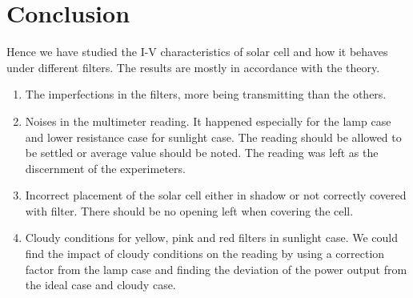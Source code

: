 \section{Conclusion}
Hence we have studied the I-V characteristics of solar cell and how it behaves under different filters. The results are mostly in accordance with the theory.

\begin{enumerate}
	\item The imperfections in the filters, more being transmitting than the others.
	\item Noises in the multimeter reading. It happened especially for the lamp case and lower resistance case for sunlight case. The reading should be allowed to be settled or average value should be noted. The reading was left as the discernment of the experimeters.
	\item Incorrect placement of the solar cell either in shadow or not correctly covered with filter. There should be no opening left when covering the cell.
	\item Cloudy conditions for yellow, pink and red filters in sunlight case. We could find the impact of cloudy conditions on the reading by using a correction factor from the lamp case and finding the deviation of the power output from the ideal case and cloudy case.
\end{enumerate}